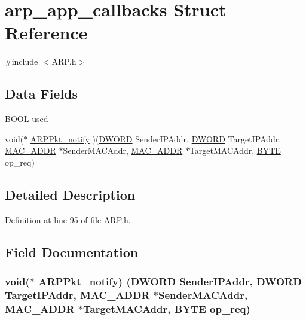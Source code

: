 \hypertarget{structarp__app__callbacks}{}\section{arp\+\_\+app\+\_\+callbacks Struct Reference}
\label{structarp__app__callbacks}


{\ttfamily \#include $<$A\+R\+P.\+h$>$}

\subsection*{Data Fields}
\begin{DoxyCompactItemize}
\item 
\hyperlink{_generic_type_defs_8h_a54d65c7fa62e62c9754371e42f5111b9}{B\+O\+O\+L} \hyperlink{structarp__app__callbacks_ab0db8fd79ec3224678ed5cae0428d292}{used}
\item 
void($\ast$ \hyperlink{structarp__app__callbacks_a326142318a576c649783c7d297821b78}{A\+R\+P\+Pkt\+\_\+notify} )(\hyperlink{_generic_type_defs_8h_ad342ac907eb044443153a22f964bf0af}{D\+W\+O\+R\+D} Sender\+I\+P\+Addr, \hyperlink{_generic_type_defs_8h_ad342ac907eb044443153a22f964bf0af}{D\+W\+O\+R\+D} Target\+I\+P\+Addr, \hyperlink{_stack_tsk_8h_ad13a037a42c866ac11db19330b840589}{M\+A\+C\+\_\+\+A\+D\+D\+R} $\ast$Sender\+M\+A\+C\+Addr, \hyperlink{_stack_tsk_8h_ad13a037a42c866ac11db19330b840589}{M\+A\+C\+\_\+\+A\+D\+D\+R} $\ast$Target\+M\+A\+C\+Addr, \hyperlink{_generic_type_defs_8h_a4ae1dab0fb4b072a66584546209e7d58}{B\+Y\+T\+E} op\+\_\+req)
\end{DoxyCompactItemize}


\subsection{Detailed Description}


Definition at line 95 of file A\+R\+P.\+h.



\subsection{Field Documentation}
\hypertarget{structarp__app__callbacks_a326142318a576c649783c7d297821b78}{}
\subsubsection[{A\+R\+P\+Pkt\+\_\+notify}]{\setlength{\rightskip}{0pt plus 5cm}void($\ast$ A\+R\+P\+Pkt\+\_\+notify) ({\bf D\+W\+O\+R\+D} Sender\+I\+P\+Addr, {\bf D\+W\+O\+R\+D} Target\+I\+P\+Addr, {\bf M\+A\+C\+\_\+\+A\+D\+D\+R} $\ast$Sender\+M\+A\+C\+Addr, {\bf M\+A\+C\+\_\+\+A\+D\+D\+R} $\ast$Target\+M\+A\+C\+Addr, {\bf B\+Y\+T\+E} op\+\_\+req)}\label{structarp__app__callbacks_a326142318a576c649783c7d297821b78}



